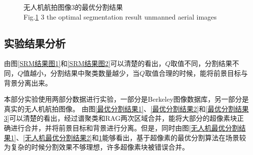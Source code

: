 \begin{figure}[H]
\centering
    \captionsetup{justification=centering}
    \caption{无人机航拍图像3的最优分割结果\\ Fig.\ref{无人机最优分割结果3} 3 the optimal segmentation result unmanned aerial images}\label{无人机最优分割结果3}
\end{figure}



\subsection{实验结果分析}

由图\ref{SRM结果图1}和\ref{SRM结果图2}可以清楚的看出，$Q$取值不同，分割结果不同，$Q$值越小，分割结果中聚类数量越少，当$Q$取值合理的时候，能将前景目标与背景分离出来。

本部分实验使用两部分数据进行实验，一部分是Berkeley图像数据库，另一部分是真实的无人机航拍图像。
由图\ref{最优分割结果1}、\ref{最优分割结果2}和\ref{最优分割结果3}可以清楚的看出，经过谱聚类和RAG两次区域合并，能将大部分的超像素块正确进行合并，并将前景目标和背景进行分离。但是，同时由图\ref{无人机最优分割结果1}、\ref{无人机最优分割结果2}和\ref{无人机最优分割结果3}能够看出，基于超像素的最优分割算法在场景较为复杂的时候分割效果不够理想，许多超像素块被错误合并。
